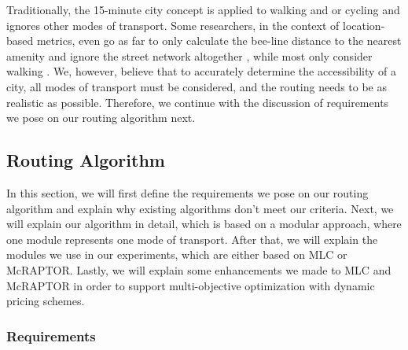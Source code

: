 Traditionally, the 15-minute city concept is applied to walking and or cycling and ignores other modes of transport.
Some researchers, in the context of location-based metrics, even go as far to only calculate the bee-line distance to the nearest amenity and ignore the street network altogether , while most only consider walking .
We, however, believe that to accurately determine the accessibility of a city, all modes of transport must be considered, and the routing needs to be as realistic as possible.
Therefore, we continue with the discussion of requirements we pose on our routing algorithm next.


\subsection{Routing Algorithm}
\label{subs:routing_algorithm}

In this section, we will first define the requirements we pose on our routing algorithm and explain why existing algorithms don't meet our criteria.
Next, we will explain our algorithm in detail, which is based on a modular approach, where one module represents one mode of transport.
After that, we will explain the modules we use in our experiments, which are either based on MLC or McRAPTOR.
Lastly, we will explain some enhancements we made to MLC and McRAPTOR in order to support multi-objective optimization with dynamic pricing schemes.

\subsubsection{Requirements}
\label{subsubsec:requirements}


